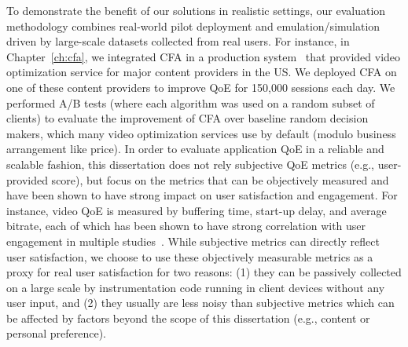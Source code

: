 
To demonstrate the benefit of our solutions in realistic settings, 
our evaluation methodology combines real-world pilot deployment and 
emulation/simulation driven by large-scale datasets collected from real  users.
For instance, in Chapter~\ref{ch:cfa}, we integrated CFA in a production 
system~\cite{c3} that provided video optimization service for major content
providers in the US.
We deployed CFA on one of these content providers to improve QoE for
150,000 sessions each day. We performed A/B tests (where each algorithm
was used on a random subset of clients) to evaluate
the improvement of CFA over baseline random decision
makers, which many video optimization services use
by default (modulo business arrangement like price).
%
In order to evaluate application QoE in a reliable 
and scalable fashion, this dissertation does not rely subjective QoE 
metrics (e.g., user-provided score), but focus on the metrics that can be
objectively measured and 
have been shown to have strong impact on user satisfaction 
and engagement.
For instance, video QoE is measured by buffering time, start-up delay,
and average bitrate, each of which has been shown to have strong
correlation with user engagement in multiple 
studies~\cite{sigcomm11,imc12akamai}.
While subjective metrics can directly reflect user satisfaction, we
choose to use these objectively measurable 
metrics as a proxy for real user satisfaction for two reasons:
(1) they can be passively collected on a large scale by instrumentation code 
running in client devices without any user input, and (2) they usually
are less noisy than subjective metrics which can be affected by factors
beyond the scope of this dissertation (e.g., content or personal preference).




